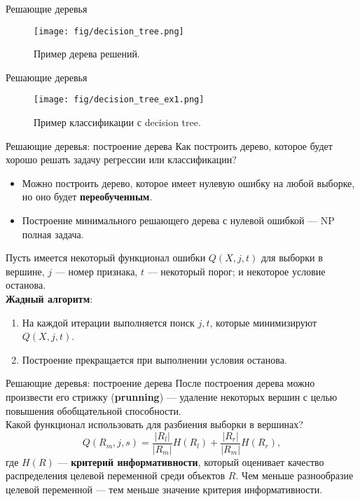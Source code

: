 \documentclass[handout]{beamer}
\begin{document}
\begin{frame}{Решающие деревья}
	\begin{figure}
	    \texttt{[image: fig/decision\_tree.png]}
	    \caption{\small Пример дерева решений.
	    } 
	    \label{fig:w_series}
	\end{figure}
\end{frame}

\begin{frame}{Решающие деревья}
	\begin{figure}
		    \texttt{[image: fig/decision\_tree\_ex1.png]}
		    \caption{\small Пример классификации с decision tree.
		    } 
		    \label{fig:w_series}
	\end{figure}
\end{frame}

\begin{frame}{Решающие деревья: построение дерева}
	Как построить дерево, которое будет хорошо решать задачу регрессии или классификации?
	\begin{itemize}
		\item Можно построить дерево, которое имеет нулевую ошибку на любой выборке, но оно будет \textbf{переобученным}.
		\item Построение минимального решающего дерева с нулевой ошибкой --- NP полная задача.
	\end{itemize}
	Пусть имеется некоторый функционал ошибки $Q(X, j, t)$ для выборки в вершине, $j$ --- номер признака, $t$ --- некоторый порог; и некоторое условие останова.\\
	\textbf{Жадный алгоритм}:
	\begin{enumerate}
		\item На каждой итерации выполняется поиск $j, t$, которые минимизируют $Q(X, j, t)$. 
		\item Построение прекращается при выполнении условия останова. 
	\end{enumerate}
\end{frame}

\begin{frame}{Решающие деревья: построение дерева}
	После построения дерева можно произвести его стрижку (\textbf{prunning}) --- удаление некоторых вершин с целью повышения обобщательной способности.\\
	Какой функционал использовать для разбиения выборки в вершинах?
	\begin{equation}
		Q(R_m, j, s) = \frac{|R_l|}{|R_m|}H(R_l) + \frac{|R_r|}{|R_m|}H(R_r),
	\end{equation}
	где $H(R)$ --- \textbf{критерий информативности}, который оценивает качество распределения целевой переменной среди объектов $R$. Чем меньше разнообразие целевой переменной --- тем меньше значение критерия информативности.

\end{frame}
\end{document}
